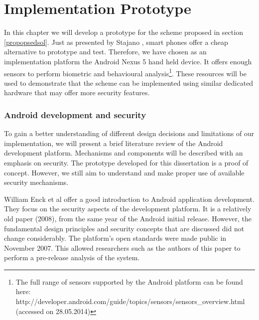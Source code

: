 
\chapter{Implementation Prototype} %

\label{Chapter4} %

In this chapter we will develop a prototype for the scheme proposed in section \ref{propopsedsol}. Just as presented by Stajano \cite{stajano2011pico}, smart phones offer a cheap alternative to prototype and test. Therefore, we have chosen as an implementation platform the Android Nexus 5 hand held device. It offers enough sensors to perform biometric and behavioural analysis\footnote{The full range of sensors supported by the Android platform can be found here: http://developer.android.com/guide/topics/sensors/sensors\_overview.html (accessed on 28.05.2014)}. These resources will be used to demonstrate that the scheme can be implemented using similar dedicated hardware that may offer more security features.

\subsection{Android development and security}
To gain a better understanding of different design decisions and limitations of our implementation, we will present a brief literature review of the Android development platform. Mechanisms and components will be described with an emphasis on security. The prototype developed for this dissertation is a proof of concept. However, we still aim to understand and make proper use of available security mechanisms. 

William Enck et al \cite{enck2009understanding} offer a good introduction to Android application development. They focus on the security aspects of the development platform. It is a relatively old paper (2008), from the same year of the Android initial release. However, the fundamental design principles and security concepts that are discussed did not change considerably. The platform's open standards were made public in November 2007. This allowed researchers such as the authors of this paper to perform a pre-release analysis of the system.

